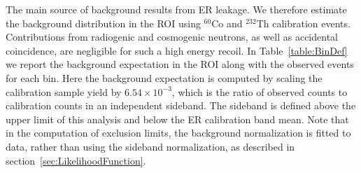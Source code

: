 The main source of background results from ER leakage. We therefore estimate the background distribution in the ROI using $^{60}$Co and $^{232}$Th calibration events.  
Contributions from radiogenic and cosmogenic neutrons, as well as accidental coincidence, are negligible for such a high energy recoil. In Table~\ref{table:BinDef} we report the 
background expectation in the ROI along with the observed events for each bin.
Here the background expectation is computed by scaling the calibration sample yield by $6.54\times10^{-3}$, which is the ratio of observed counts to calibration counts in an independent sideband. The sideband is defined above the upper limit of this analysis and below the ER calibration band mean. Note that in the computation of exclusion limits, the background normalization is fitted to data, rather than using the sideband normalization, as described in section~\ref{sec:LikelihoodFunction}. 



\begin{table}

\caption{Definitions and contents of the analysis bins for the high energy channel. The expected background counts are calculated by taking the calibration sample and scaling it by $6.54\times10^{-3}$, which is the ratio of observed counts to calibration counts in a sideband.}  \label{table:BinDef} 
\end{table}






